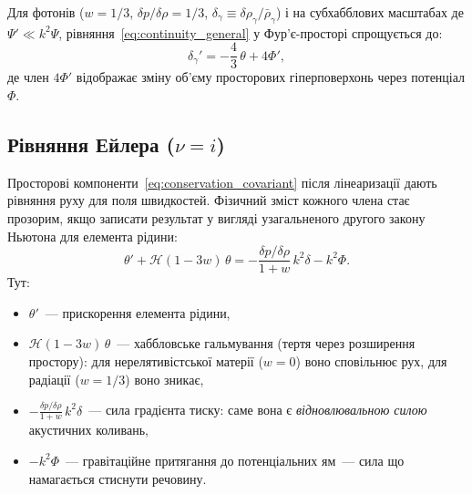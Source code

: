 Для фотонів ($w = 1/3$, $\delta p/\delta\rho = 1/3$,
$\delta_\gamma \equiv \delta\rho_\gamma/\bar\rho_\gamma$)
і на субхабблових масштабах де $\Psi' \ll k^2\Psi$,
рівняння~\eqref{eq:continuity_general} у Фур'є-просторі
спрощується до:
\begin{equation}\label{eq:continuity_photon}
  \delta_\gamma' = -\frac{4}{3}\,\theta + 4\Phi',
\end{equation}
де член $4\Phi'$ відображає зміну об'єму просторових
гіперповерхонь через потенціал $\Phi$.


\subsection*{Рівняння Ейлера ($\nu = i$)}

Просторові компоненти~\eqref{eq:conservation_covariant}
після лінеаризації дають рівняння руху для поля швидкостей.
Фізичний зміст кожного члена стає прозорим, якщо записати
результат у вигляді узагальненого другого закону Ньютона для
елемента рідини:
\begin{equation}\label{eq:euler_general}
  \theta' + \mathcal{H}(1 - 3w)\,\theta
  = -\frac{\delta p / \delta\rho}{1+w}\,k^2\delta
    - k^2\Phi.
\end{equation}
Тут:
\begin{itemize}
  \item $\theta'$~--- прискорення елемента рідини,
  \item $\mathcal{H}(1-3w)\,\theta$~--- хаббловське
        гальмування (тертя через розширення простору):
        для нерелятивістської матерії ($w=0$) воно сповільнює
        рух, для радіації ($w=1/3$) воно зникає,
  \item $-\frac{\delta p/\delta\rho}{1+w}\,k^2\delta$~---
        сила градієнта тиску: саме вона є \emph{відновлювальною
        силою} акустичних коливань,
  \item $-k^2\Phi$~--- гравітаційне притягання до потенціальних
        ям~--- сила що намагається стиснути речовину.
\end{itemize}

